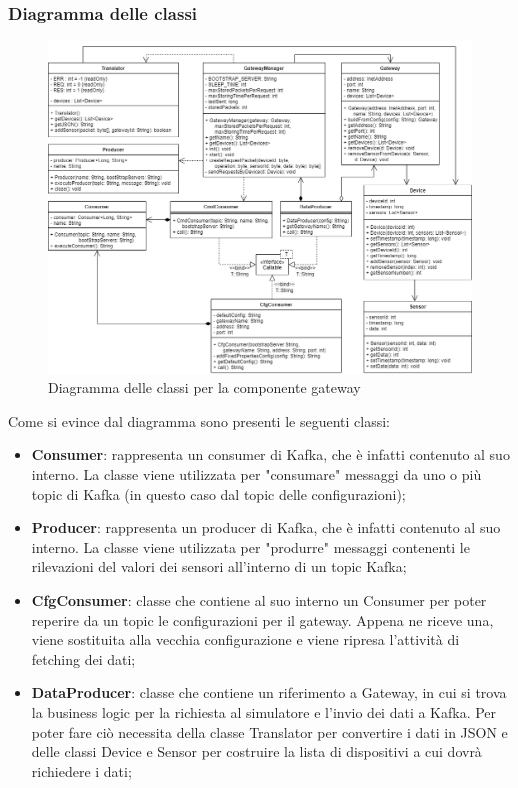 	\begin{landscape}
		\subsubsection{Diagramma delle classi}%
		  	\begin{figure}[H]
				\centering
				\includegraphics[scale=0.499]{res/images/GATEWAY/ClassiGateway.png}
				\caption{Diagramma delle classi per la componente gateway}
				\label{Diagramma 2}
			\end{figure}
	Come si evince dal diagramma sono presenti le seguenti classi:
	\begin{itemize}
		\item \textbf{Consumer}: rappresenta un consumer di Kafka, che è infatti contenuto al suo interno. La classe viene utilizzata per "consumare" messaggi da uno o più topic di Kafka (in questo caso dal topic delle configurazioni); 
		\item \textbf{Producer}: rappresenta un producer di Kafka, che è infatti contenuto al suo interno. La classe viene utilizzata per "produrre" messaggi contenenti le rilevazioni del valori dei sensori all'interno di un topic Kafka;
		\item \textbf{CfgConsumer}: classe che contiene al suo interno un Consumer per poter reperire da un topic  le configurazioni per il gateway. Appena ne riceve una, viene sostituita alla vecchia configurazione e viene ripresa l'attività di fetching dei dati;
		\item \textbf{DataProducer}: classe che contiene un riferimento a Gateway, in cui si trova la business logic per la richiesta al simulatore e l'invio dei dati a Kafka. Per poter fare ciò necessita della classe Translator per convertire i dati in JSON e delle classi Device e Sensor per costruire la lista di dispositivi a cui dovrà richiedere i dati;

\end{itemize}
\end{landscape}
